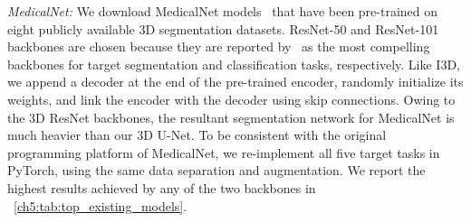 \textit{MedicalNet:} We download MedicalNet models~\citep{chen2019med3d} that have been pre-trained on eight publicly available 3D segmentation datasets. ResNet-50 and ResNet-101 backbones are chosen because they are reported by~\citet{chen2019med3d} as the most compelling backbones for target segmentation and classification tasks, respectively. Like I3D, we append a decoder at the end of the pre-trained encoder, randomly initialize its weights, and link the encoder with the decoder using skip connections. Owing to the 3D ResNet backbones, the resultant segmentation network for MedicalNet is much heavier than our 3D U-Net. To be consistent with the original programming platform of MedicalNet, we re-implement all five target tasks in PyTorch, using the same data separation and augmentation. We report the highest results achieved by any of the two backbones in \tablename~\ref{ch5:tab:top_existing_models}.